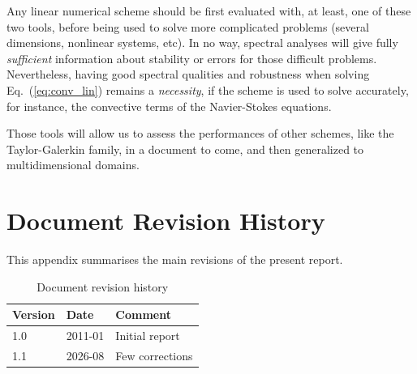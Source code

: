 \noindent Any linear numerical scheme should be first evaluated with, at least, one of these two tools, before being used to solve more complicated problems (several dimensions, nonlinear systems, etc). In no way, spectral analyses will give fully \emph{sufficient} information about stability or errors for those difficult problems. Nevertheless, having good spectral qualities and robustness when solving Eq.~(\ref{eq:conv_lin}) remains a \emph{ necessity}, if the scheme is used to solve accurately, for instance, the convective terms of the Navier-Stokes equations.

\noindent Those tools will allow us to assess the performances of other schemes, like the Taylor-Galerkin family, in a document to come, and then generalized to multidimensional domains.


\appendix
\section{Document Revision History \label{app:revision}}

This appendix summarises the main revisions of the present report.

\begin{table}[h]
    \centering
    \label{tab:revision-history}
    \begin{tabular}{p{2cm}p{2.5cm}p{8cm}}
        \toprule
        \textbf{Version} & \textbf{Date} & \textbf{Comment} \\
        \midrule
        1.0 & 2011-01 & Initial report \\
        1.1 & 2026-08 & Few corrections \\
        \bottomrule
    \end{tabular}
	\caption{Document revision history}
\end{table}


\newpage






